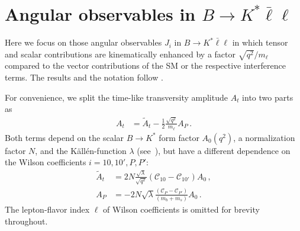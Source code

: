 \documentclass[twocolumn,epjc3]{svjour3}
\numberwithin{equation}{section}
\newcommand{\checked}[1]{{\color{brown}{ {\bf Checked: }{#1}}}}
\renewcommand{\checked}[1]{#1}
\newcommand{\wilson}[2][{}]{\mathcal{C}_{#2}^{\mathrm{#1}}}
\renewcommand{\[}{\big[}
\renewcommand{\]}{\big]}
\renewcommand{\(}{\big(}
\renewcommand{\)}{\big)}
\begin{document}
%
%
%
\section{
  \checked{Angular observables in $B\to K^* \bar\ell\ell$}
  \label{app:BKstarellell}
}

Here we focus on those angular observables $J_i$ in $B\to K^* \bar\ell\ell$ in
which tensor and scalar contributions are kinematically enhanced by a factor
$\sqrt{q^2}/m_\ell$ compared to the vector contributions of the SM or the
respective interference terms. The results and the notation follow
\cite{Bobeth:2012vn}.

For convenience, we split the time-like transversity amplitude $A_t$ into two
parts as
\begin{align}
  A_t &
  = \tilde{A}_t - \frac{1}{2} \frac{\sqrt{q^2}}{m_\ell} A_P \, .
\end{align}
Both terms depend on the scalar $B\to K^*$ form factor $A_0(q^2)$, a
normalization factor $N$, and the K{\"a}ll{\'e}n-function $\lambda$
(see~\cite{Bobeth:2012vn}), but have a different dependence on the
Wilson coefficients $i = 10, 10', P, P'$:
\begin{equation}
\begin{aligned}
  \tilde{A}_t & = 2 N \frac{\sqrt{\lambda}}{\sqrt{q^2}}
    (\wilson[]{10} - \wilson[]{10'}) A_0\,,
\\
  A_P & = - 2 N\sqrt{\lambda} \frac{(\wilson[]{P} - \wilson[]{P'})}{(m_b+m_s)} A_0\,.
\end{aligned}
\end{equation}
The lepton-flavor index $\ell$ of Wilson coefficients is omitted for brevity
throughout.
\end{document}
